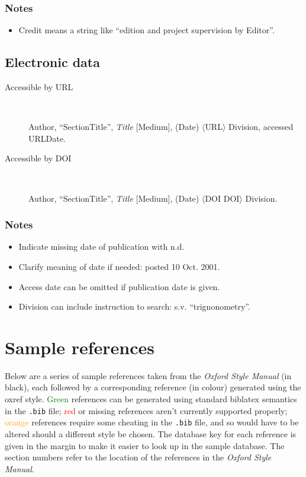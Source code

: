 \documentclass[extrafontsizes,11pt,a4paper,oneside]{memoir}
\newcommand*{\lit}[1]{\textsf{#1}}
\begin{document}
\subsection{Notes}
\begin{itemize}
  \item Credit means a string like \enquote{edition and project supervision by Editor}.
\end{itemize}

\section{Electronic data}\label{sec:electronic}

\begin{description}
  \item[Accessible by URL]~
  \par Author, \enquote{SectionTitle}, \emph{Title} [Medium], (Date) $\langle$URL$\rangle$ Division, \lit{accessed} URLDate.
  \\
  \item[Accessible by DOI]~
  \par Author, \enquote{SectionTitle}, \emph{Title} [Medium], (Date) $\langle$\lit{DOI} DOI$\rangle$ Division.
\end{description}

\subsection{Notes}
\begin{itemize}
  \item Indicate missing date of publication with n.d.
  \item Clarify meaning of date if needed: posted 10 Oct. 2001.
  \\
  \item Access date can be omitted if publication date is given.
  \item Division can include instruction to search: s.v. \enquote{trignonometry}.
\end{itemize}

\chapter{Sample references}
\setlength{\parindent}{0pt}\nonzeroparskip

Below are a series of sample references taken from the \emph{Oxford Style Manual} (in black), each followed by a corresponding reference (in colour) generated using the \textsf{oxref} style. \textcolor{Green}{Green} references can be generated using standard \textsf{biblatex} semantics in the \texttt{.bib} file; \textcolor{red}{red} or missing references aren't currently supported properly; \textcolor{orange}{orange} references require some cheating in the \texttt{.bib} file, and so would have to be altered should a different style be chosen. The database key for each reference is given in the margin to make it easier to look up in the sample database. The section numbers refer to the location of the references in the \emph{Oxford Style Manual}.
\end{document}
